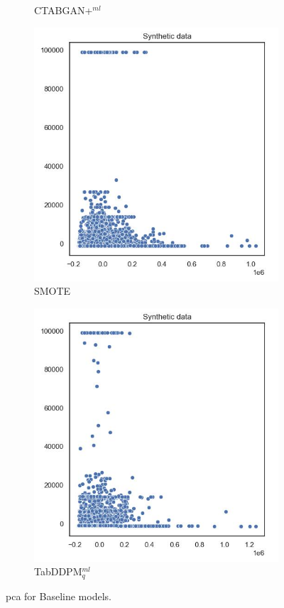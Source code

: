 \begin{figure}[H]
\begin{subfigure}{0.3\textwidth}
		\caption{CTABGAN+$^{ml}$}
	\end{subfigure}
	\begin{subfigure}{0.3\textwidth}
		\centering
		\includegraphics[width=\textwidth]{images/pca/smote.jpg}
		\caption{SMOTE}
	\end{subfigure}
	\begin{subfigure}{0.3\textwidth}
		\centering
		\includegraphics[width=\textwidth]{images/pca/tab-ddpm.jpg}
		\caption{TabDDPM$^{ml}_q$}
	\end{subfigure}
	\caption[PCA plots Baseline Models]{\gls{pca} for Baseline models.}
	\label{fig:pca_base}
\end{figure}


